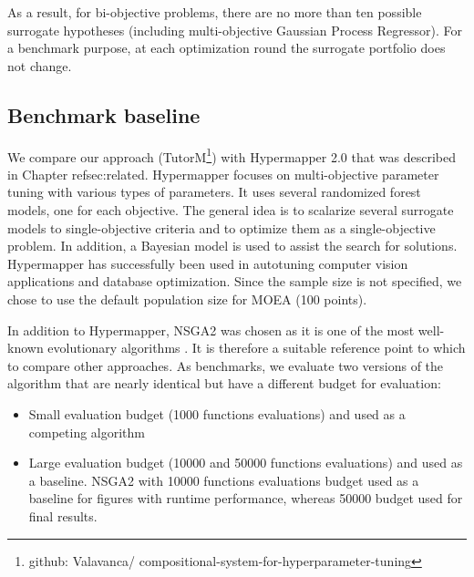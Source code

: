     As a result, for bi-objective problems, there are no more than ten possible surrogate hypotheses (including multi-objective Gaussian Process Regressor). For a benchmark purpose, at each optimization round the surrogate portfolio does not change. 

    \subsection{Benchmark baseline}
    We compare our approach (TutorM\footnote{{github: Valavanca/ compositional-system-for-hyperparameter-tuning}}) with Hypermapper 2.0\cite{nardi2019practical} that was described in Chapter ref{sec:related}. Hypermapper focuses on multi-objective parameter tuning with various types of parameters. It uses several randomized forest models, one for each objective. The general idea is to scalarize several surrogate models to single-objective criteria and to optimize them as a single-objective problem. In addition, a Bayesian model is used to assist the search for solutions. Hypermapper has successfully been used in autotuning computer vision applications and database optimization. Since the sample size is not specified, we chose to use the default population size for MOEA (100 points).

    In addition to Hypermapper, NSGA2 was chosen as it is one of the most well-known evolutionary algorithms \cite{RamirezRV19}. It is therefore a suitable reference point to which to compare other approaches. As benchmarks, we evaluate two versions of the algorithm that are nearly identical but have a different budget for evaluation:
        \begin{itemize}
            \item Small evaluation budget (1000 functions evaluations) and used as a competing algorithm
            \item Large evaluation budget (10000 and 50000 functions evaluations) and used as a baseline. NSGA2 with 10000 functions evaluations budget used as a baseline for figures with runtime performance, whereas 50000 budget used for final results.
        \end{itemize}



